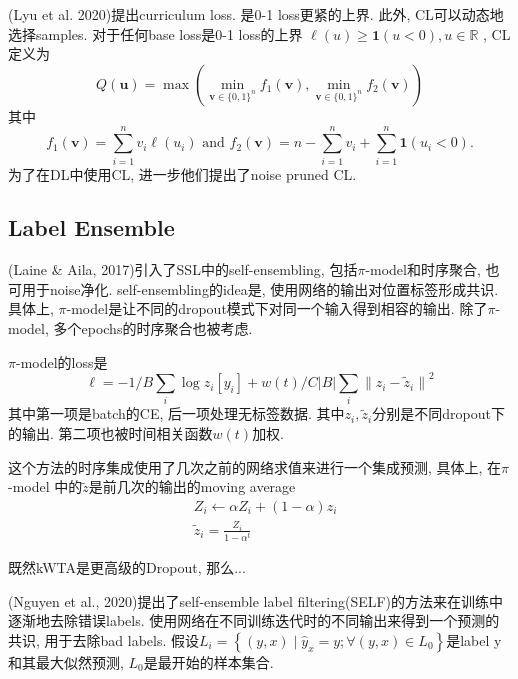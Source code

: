 \documentclass{article}
\begin{document}
(Lyu et al. 2020)提出curriculum loss. 是0-1 loss更紧的上界. 此外, CL可以动态地选择samples. 对于任何base loss是0-1 loss的上界
$\ell(u)\ge \mathbf{1}(u<0), u \in \mathbb{R}$
, CL定义为
\begin{equation}
    Q(\mathbf{u})=\max \left(\min _{\mathbf{v} \in\{0,1\}^{n}} f_{1}(\mathbf{v}), \min _{\mathbf{v} \in\{0,1\}^{n}} f_{2}(\mathbf{v})\right)
\end{equation}
其中
\begin{equation}
    f_{1}(\mathbf{v})=\sum_{i=1}^{n} v_{i} \ell\left(u_{i}\right) \text { and } f_{2}(\mathbf{v})=n-\sum_{i=1}^{n} v_{i}+\sum_{i=1}^{n} \mathbf{1}\left(u_{i}<0\right) .
\end{equation}
为了在DL中使用CL, 进一步他们提出了noise pruned CL.

\subsection{Label Ensemble}

(Laine \& Aila, 2017)引入了SSL中的self-ensembling, 包括$\pi$-model和时序聚合, 也可用于noise净化. self-ensembling的idea是, 使用网络的输出对位置标签形成共识. 具体上, $\pi$-model是让不同的dropout模式下对同一个输入得到相容的输出. 除了$\pi$-model, 多个epochs的时序聚合也被考虑.

$\pi$-model的loss是
\begin{equation}
    \ell=-1 / B \sum_{i} \log z_{i}\left[y_{i}\right]+w(t) / C|B| \sum_{i}\left\|z_{i}-\tilde{z}_{i}\right\|^{2}
\end{equation}
其中第一项是batch的CE, 后一项处理无标签数据. 其中$z_i,\tilde z_i$分别是不同dropout下的输出. 第二项也被时间相关函数$w(t)$加权.

这个方法的时序集成使用了几次之前的网络求值来进行一个集成预测, 具体上, 在$\pi$-model
中的$\tilde z$是前几次的输出的moving average
\begin{align}
    &Z_{i} \leftarrow \alpha Z_{i}+(1-\alpha) z_{i}\\
    &\tilde z_i = \frac{Z_i}{1-\alpha ^t}
\end{align}

\begin{remark}
    既然kWTA是更高级的Dropout, 那么...
\end{remark}

(Nguyen et al., 2020)提出了self-ensemble label filtering(SELF)的方法来在训练中逐渐地去除错误labels. 使用网络在不同训练迭代时的不同输出来得到一个预测的共识, 用于去除bad labels. 假设$L_{i}=\left\{(y, x) \mid \hat{y}_{x}=y ; \forall(y, x) \in L_{0}\right\}$是label y和其最大似然预测, $L_0$是最开始的样本集合. 
\end{document}
